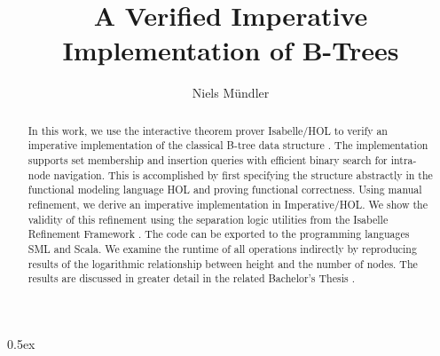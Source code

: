 \documentclass[11pt,a4paper]{article}
\begin{document}
\title{A Verified Imperative Implementation of B-Trees}
\author{Niels Mündler}
\date{}
\maketitle

\begin{abstract}
In this work, we use the interactive theorem prover Isabelle/HOL
to verify an imperative implementation of the classical B-tree data structure \cite{DBLP:journals/acta/BayerM72}.
The implementation supports set membership and insertion queries
with efficient binary search for intra-node navigation.
This is accomplished by first specifying the structure abstractly 
in the functional modeling language HOL and proving functional correctness.
Using manual refinement, we derive an imperative implementation
in Imperative/HOL.
We show the validity of this refinement using
the separation logic utilities from the
Isabelle Refinement Framework \cite{Refine_Imperative_HOL-AFP}. 
The code can be exported to the programming languages SML and Scala.
We examine the runtime of all operations indirectly by reproducing results
of the logarithmic relationship between height and the number of nodes.
The results are discussed in greater detail in the related Bachelor's Thesis
\cite{BTNielsMuendler}.
\end{abstract}

\tableofcontents

\parindent 0pt\parskip 0.5ex



{\raggedright


}
\end{document}
